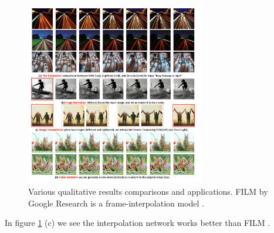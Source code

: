 \begin{figure}
    \centering
    \includegraphics[width=0.7\textwidth]{images/make_a_video/examples2.png}
    \caption{Various qualitative results comparisons and applications. FILM by Google Research is a frame-interpolation model \cite{film}  \cite{make_a_video}.}
    \label{fig:make_a_video_examples2}
\end{figure}

In figure \ref{fig:make_a_video_examples2} (c) we see the interpolation network works better than FILM \cite{film}.

